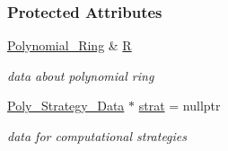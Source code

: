\subsubsection*{Protected Attributes}
\begin{DoxyCompactItemize}
\item 
\mbox{\label{group__polygroup_a551ade20b7dcd96c227dd0401f6ffbbe}} 
\hyperlink{group__polygroup_class_polynomial___ring}{Polynomial\+\_\+\+Ring} \& \hyperlink{group__polygroup_a551ade20b7dcd96c227dd0401f6ffbbe}{R}
\begin{DoxyCompactList}\small\item\em data about polynomial ring \end{DoxyCompactList}\item 
\mbox{\label{group__polygroup_a764336acff942ed6d6e160b5d62f90c1}} 
\hyperlink{group__strategygroup_class_poly___strategy___data}{Poly\+\_\+\+Strategy\+\_\+\+Data} $\ast$ \hyperlink{group__polygroup_a764336acff942ed6d6e160b5d62f90c1}{strat} = nullptr
\begin{DoxyCompactList}\small\item\em data for computational strategies \end{DoxyCompactList}\end{DoxyCompactItemize}
